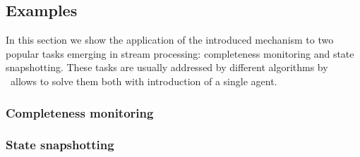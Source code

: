 \subsection{Examples} \label{tracker_examples}
In this section we show the application of the introduced mechanism to two popular tasks emerging in stream processing: completeness monitoring and state snapshotting. These tasks are usually addressed by different algorithms by \tracker\ allows to solve them both with introduction of a single agent.
\subsubsection{Completeness monitoring}

\subsubsection{State snapshotting}



